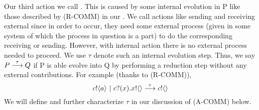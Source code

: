 Our third action we call . This is caused by some internal evolution in P like those described by (R-COMM) in our .  We call actions like sending and receiving external since in order to occur, they need some external process (given in some system of which the process in question is a part) to do the corresponding receiving or sending. However, with internal action there is no external process needed to proceed.  We use $\tau$ denote such an internal evolution step.  Thus, we say $P \overset{{\tau}}{\longrightarrow} Q$ if P is able evolve into Q by performing a reduction step without any external contributions.  For example (thanks to (R-COMM)),
\[
	{c}!\langle{a}\rangle \ |\  {c}?({x}).{x}!\langle{}\rangle \overset{{\tau}}{\longrightarrow} {c}!\langle{}\rangle 
\]
We will define and further characterize $\tau$ in our discussion of (A-COMM) below.

